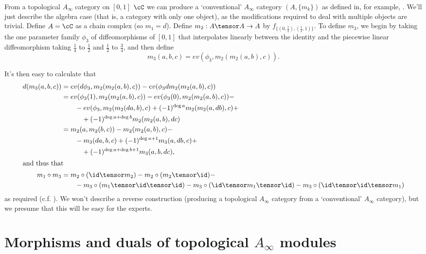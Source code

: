 \documentclass[11pt,leqno]{amsart}
\begin{document}
From a topological $A_\infty$ category on $[0,1]$ $\cC$ we can produce a `conventional' $A_\infty$ category $(A, \{m_k\})$ as defined in, for example, \cite{MR1854636}. We'll just describe the algebra case (that is, a category with only one object), as the modifications required to deal with multiple objects are trivial. Define $A = \cC$ as a chain complex (so $m_1 = d$). Define $m_2 : A\tensor A \to A$ by $f_{\{(0,\frac{1}{2}),(\frac{1}{2},1)\}}$. To define $m_3$, we begin by taking the one parameter family $\phi_3$ of diffeomorphisms of $[0,1]$ that interpolates linearly between the identity and the piecewise linear diffeomorphism taking $\frac{1}{4}$ to $\frac{1}{2}$ and $\frac{1}{2}$ to $\frac{3}{4}$, and then define
\begin{equation*}
m_3(a,b,c) = ev(\phi_3, m_2(m_2(a,b), c)).
\end{equation*}

It's then easy to calculate that
\begin{align*}
d(m_3(a,b,c)) & = ev(d \phi_3, m_2(m_2(a,b),c)) - ev(\phi_3 d m_2(m_2(a,b), c)) \\
 & = ev( \phi_3(1), m_2(m_2(a,b),c)) - ev(\phi_3(0), m_2 (m_2(a,b),c)) - \\ & \qquad - ev(\phi_3, m_2(m_2(da, b), c) + (-1)^{\deg a} m_2(m_2(a, db), c) + \\ & \qquad \quad + (-1)^{\deg a+\deg b} m_2(m_2(a, b), dc) \\
 & = m_2(a , m_2(b,c)) - m_2(m_2(a,b),c) - \\ & \qquad - m_3(da,b,c) + (-1)^{\deg a + 1} m_3(a,db,c) + \\ & \qquad \quad + (-1)^{\deg a + \deg b + 1} m_3(a,b,dc), \\
\intertext{and thus that}
m_1 \circ m_3 & =  m_2 \circ (\id \tensor m_2) - m_2 \circ (m_2 \tensor \id) - \\ & \qquad - m_3 \circ (m_1 \tensor \id \tensor \id) - m_3 \circ (\id \tensor m_1 \tensor \id) - m_3 \circ (\id \tensor \id \tensor m_1)
\end{align*}
as required (c.f. \cite[p. 6]{MR1854636}).
We won't describe a reverse construction (producing a topological $A_\infty$ category from a `conventional' $A_\infty$ category), but we presume that this will be easy for the experts.

\section{Morphisms and duals of topological $A_\infty$ modules}
\label{sec:A-infty-hom-and-duals}%
\end{document}
